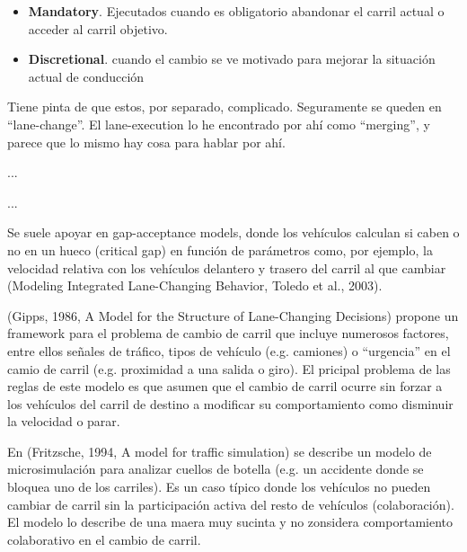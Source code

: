 \begin{itemize}
	\item \textbf{Mandatory}. Ejecutados cuando es obligatorio abandonar el carril actual o acceder al carril objetivo.
	\item \textbf{Discretional}. cuando el cambio se ve motivado para mejorar la situación actual de conducción 
\end{itemize}





Tiene pinta de que estos, por separado, complicado. Seguramente se queden en \enquote{lane-change}. El lane-execution lo he encontrado por ahí como \enquote{merging}, y parece que lo mismo hay cosa para hablar por ahí.

 ...

 ...





Se suele apoyar en gap-acceptance models, donde los vehículos calculan si caben o no en un hueco (critical gap) en función de parámetros como, por ejemplo, la velocidad relativa con los vehículos delantero y trasero del carril al que cambiar (Modeling Integrated Lane-Changing Behavior, Toledo et al., 2003).






(Gipps, 1986, A Model for the Structure of Lane-Changing Decisions) propone un framework para el problema de cambio de carril que incluye numerosos factores, entre ellos señales de tráfico, tipos de vehículo (e.g. camiones) o \enquote{urgencia} en el camio de carril (e.g. proximidad a una salida o giro). El pricipal problema de las reglas de este modelo es que asumen que el cambio de carril ocurre sin forzar a los vehículos del carril de destino a modificar su comportamiento como disminuir la velocidad o parar.

En (Fritzsche, 1994, A model for traffic simulation) se describe un modelo de microsimulación para analizar cuellos de botella (e.g. un accidente donde se bloquea uno de los carriles). Es un caso típico donde los vehículos no pueden cambiar de carril sin la participación activa del resto de vehículos (colaboración). El modelo lo describe de una maera muy sucinta y no zonsidera comportamiento colaborativo en el cambio de carril.

